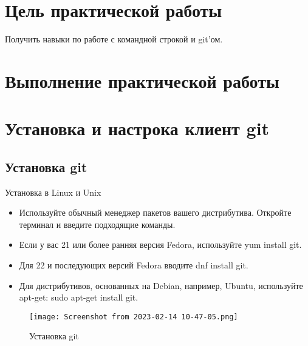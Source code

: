 \graphicspath{{/home/arbon/Pictures/Screenshots/}} %
\section*{\LARGE{Цель практической работы}}
Получить навыки по работе с командной строкой и git’ом.

\newpage

\section*{\LARGE{Выполнение практической работы}}
\section{Установка и настрока клиент git}
\subsection{Установка git}
Установка в Linux и Unix
\begin{itemize}
	\item Используйте обычный менеджер пакетов вашего дистрибутива.
		Откройте терминал и введите подходящие команды.
	\item Если у вас 21 или более ранняя версия Fedora,
		используйте yum install git.
	\item Для 22 и последующих версий Fedora вводите dnf install git.
	\item Для дистрибутивов, основанных на Debian, например, Ubuntu,
		используйте apt-get: sudo apt-get install git.
\end{itemize}
\begin{figure}[h!tp]
	\centering
	\texttt{[image: Screenshot from 2023-02-14 10-47-05.png]}
	\caption{Установка git}
	\label{fig:git:install}
\end{figure}

